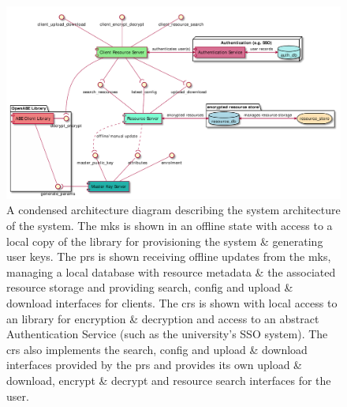 \begin{figure}
    \centering
    \includegraphics[width=\linewidth,keepaspectratio]{images/infrastructure/system_architecture_abbrv.pdf}

    \caption{
      \label{fig:sys_arch_abbrv}
      A condensed architecture diagram describing the system architecture of the \theResServer system. The \acrfull{mks} is shown in an offline state with access to a local copy of the \OpenABE library for provisioning the system \& generating user keys. The \acrfull{prs} is shown receiving offline updates from the \acrshort{mks}, managing a local database with resource metadata \& the associated resource storage and providing search, config and upload \& download interfaces for clients. The \acrfull{crs} is shown with local access to an \OpenABE library for encryption \& decryption and access to an abstract Authentication Service (such as the university's SSO system). The \acrshort{crs} also implements the search, config and upload \& download interfaces provided by the \acrshort{prs} and provides its own upload \& download, encrypt \& decrypt and resource search interfaces for the user.
    }

\end{figure}
